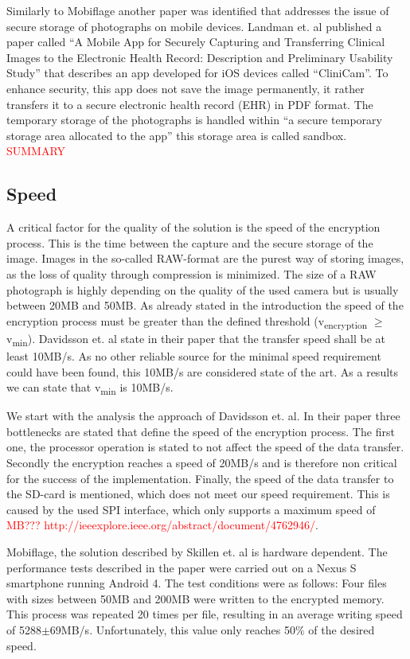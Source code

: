 \documentclass[12pt,a4paper,titlepage,oneside]{scrartcl}
\newcommand\todo[1]{\textcolor{red}{#1}}
\begin{document}
Similarly to Mobiflage another paper was identified that addresses the issue of secure storage of photographs on mobile devices.
Landman et. al \cite{pmid25565678} published a paper called ``A Mobile App for Securely Capturing and Transferring Clinical Images to the Electronic Health Record: Description and Preliminary Usability Study'' that describes an app developed for iOS devices called ``CliniCam''.
To enhance security, this app does not save the image permanently, it rather transfers it to a secure electronic health record (EHR) in PDF format.
The temporary storage of the photographs is handled within ``a secure temporary storage area allocated to the app'' this storage area is called sandbox.
\todo{SUMMARY}



\subsection{Speed}
A critical factor for the quality of the solution is the speed of the encryption process.
This is the time between the capture and the secure storage of the image.
Images in the so-called RAW-format are the purest way of storing images, as the loss of quality through compression is minimized.
The size of a RAW photograph is highly depending on the quality of the used camera but is usually between 20MB and 50MB.
As already stated in the introduction the speed of the encryption process must be greater than the defined threshold (v\textsubscript{encryption} $\geq$ v\textsubscript{min}).
Davidsson et. al \cite{Davidsson2016} state in their paper that the transfer speed shall be at least 10MB/s.
As no other reliable source for the minimal speed requirement could have been found, this 10MB/s are considered state of the art.
As a results we can state that v\textsubscript{min} is 10MB/s.

We start with the analysis the approach of Davidsson et. al.
In their paper three bottlenecks are stated that define the speed of the encryption process.
The first one, the processor operation is stated to not affect the speed of the data transfer.
Secondly the encryption reaches a speed of 20MB/s and is therefore non critical for the success of the implementation.
Finally, the speed of the data transfer to the SD-card is mentioned, which does not meet our speed requirement.
This is caused by the used SPI interface, which only supports a maximum speed of \todo{MB??? http://ieeexplore.ieee.org/abstract/document/4762946/}.

Mobiflage, the solution described by Skillen et. al \cite{skillen2013implementing} is hardware dependent.
The performance tests described in the paper were carried out on a Nexus S smartphone running Android 4.
The test conditions were as follows: 
Four files with sizes between 50MB and 200MB were written to the encrypted memory.
This process was repeated 20 times per file, resulting in an average writing speed of 5288$\pm$69MB/s.
Unfortunately, this value only reaches 50\% of the desired speed.
\end{document}
